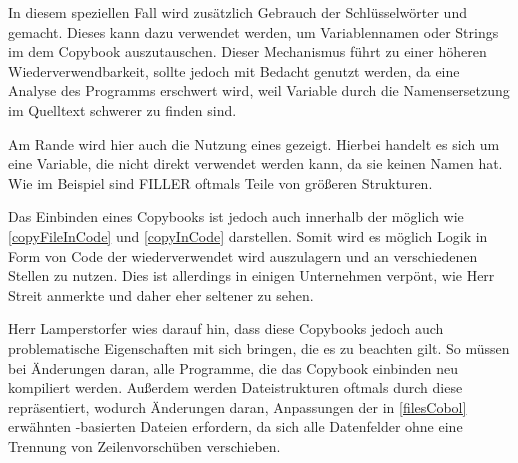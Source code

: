 In diesem speziellen Fall wird zusätzlich Gebrauch der Schlüsselwörter  und  gemacht. Dieses kann dazu verwendet werden, um Variablennamen oder Strings im dem Copybook auszutauschen. Dieser Mechanismus führt zu einer höheren Wiederverwendbarkeit, sollte jedoch mit Bedacht genutzt werden, da eine Analyse des Programms erschwert wird, weil Variable durch die Namensersetzung im Quelltext schwerer zu finden sind.

Am Rande wird hier auch die Nutzung eines  gezeigt. Hierbei handelt es sich um eine Variable, die nicht direkt verwendet werden kann, da sie keinen Namen hat. Wie im Beispiel sind FILLER oftmals Teile von größeren Strukturen.

Das Einbinden eines Copybooks ist jedoch auch innerhalb der  möglich wie \autoref{copyFileInCode} und \autoref{copyInCode} darstellen. Somit wird es möglich Logik in Form von Code der wiederverwendet wird auszulagern und an verschiedenen Stellen zu nutzen. Dies ist allerdings in einigen Unternehmen verpönt, wie Herr Streit anmerkte und daher eher seltener zu sehen.



Herr Lamperstorfer wies darauf hin, dass diese Copybooks jedoch auch problematische Eigenschaften mit sich bringen, die es zu beachten gilt. So müssen bei Änderungen daran, alle Programme, die das Copybook einbinden neu kompiliert werden. Außerdem werden Dateistrukturen oftmals durch diese repräsentiert, wodurch Änderungen daran, Anpassungen der in \autoref{filesCobol} erwähnten -basierten Dateien erfordern, da sich alle Datenfelder ohne eine Trennung von Zeilenvorschüben verschieben.

